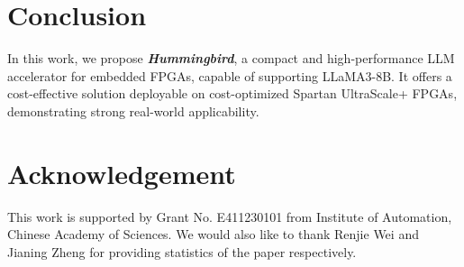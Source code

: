 \documentclass[conference]{IEEEtran}
\begin{document}
\section{Conclusion}

In this work, we propose \textbf{\textit{Hummingbird}}, a compact and high-performance LLM accelerator for embedded FPGAs, capable of supporting LLaMA3-8B.
It offers a cost-effective solution deployable on cost-optimized Spartan UltraScale+ FPGAs, demonstrating strong real-world applicability.


\section{Acknowledgement}
This work is supported by Grant No. E411230101 from Institute of Automation, Chinese Academy of Sciences.
We would also like to thank Renjie Wei and Jianing Zheng for providing statistics of the paper\cite{wei2025lightmamba}\cite{zheng2025looplynx} respectively.



\end{document}
